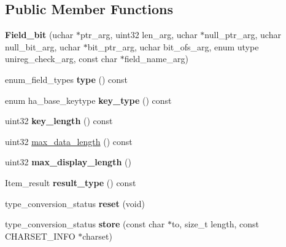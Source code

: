 \subsection*{Public Member Functions}
\begin{DoxyCompactItemize}
\item 
\mbox{\label{classField__bit_aea7859b89cb23967b03e06ea6272537f}} 
{\bfseries Field\+\_\+bit} (uchar $\ast$ptr\+\_\+arg, uint32 len\+\_\+arg, uchar $\ast$null\+\_\+ptr\+\_\+arg, uchar null\+\_\+bit\+\_\+arg, uchar $\ast$bit\+\_\+ptr\+\_\+arg, uchar bit\+\_\+ofs\+\_\+arg, enum utype unireg\+\_\+check\+\_\+arg, const char $\ast$field\+\_\+name\+\_\+arg)
\item 
\mbox{\label{classField__bit_a31de35212aeae94deab225e1e02b5788}} 
enum\+\_\+field\+\_\+types {\bfseries type} () const
\item 
\mbox{\label{classField__bit_a8394458735986a247c3dc280dd1b2190}} 
enum ha\+\_\+base\+\_\+keytype {\bfseries key\+\_\+type} () const
\item 
\mbox{\label{classField__bit_a6bbdd153b3f97533508327e169145be3}} 
uint32 {\bfseries key\+\_\+length} () const
\item 
uint32 \mbox{\hyperlink{classField__bit_acc664ced1dd95a2370fc58e7bf6e70bc}{max\+\_\+data\+\_\+length}} () const
\item 
\mbox{\label{classField__bit_ab43d6d1bd196a7fc4af300f86e42c64c}} 
uint32 {\bfseries max\+\_\+display\+\_\+length} ()
\item 
\mbox{\label{classField__bit_a9456e34b13199a7cae41ed3f07d36483}} 
Item\+\_\+result {\bfseries result\+\_\+type} () const
\item 
\mbox{\label{classField__bit_a706f8ab0da37e597dd364b2fa7c0fe37}} 
type\+\_\+conversion\+\_\+status {\bfseries reset} (void)
\item 
\mbox{\label{classField__bit_ac070958e9419212782497ed77c16de70}} 
type\+\_\+conversion\+\_\+status {\bfseries store} (const char $\ast$to, size\+\_\+t length, const C\+H\+A\+R\+S\+E\+T\+\_\+\+I\+N\+FO $\ast$charset)
\item 

\end{DoxyCompactItemize}
